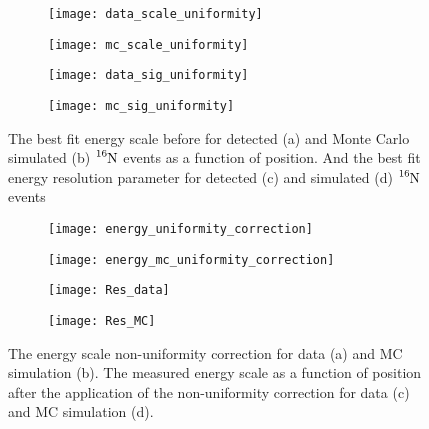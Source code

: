 \begin{figure}[htbp]
\centering
\begin{subfigure}{0.49\textwidth}
\centering
\texttt{[image: data\_scale\_uniformity]}
\caption[]{}
\end{subfigure}
\hfill
\begin{subfigure}{0.49\textwidth}
\centering
\texttt{[image: mc\_scale\_uniformity]}
\caption[]{}
\end{subfigure}

\begin{subfigure}{0.49\textwidth}
\centering
\texttt{[image: data\_sig\_uniformity]}
\caption[]{}
\end{subfigure}
\hfill
\begin{subfigure}{0.49\textwidth}
\centering
\texttt{[image: mc\_sig\_uniformity]}
\caption[]{}
\end{subfigure}
\caption[Position Depedence of Energy Scale and Resolution from $\ce{^{16}N}$]
{The best fit energy scale before for detected (a) and Monte Carlo simulated (b)  $\ce{^{16}N}$
events as a function of position.
And the best fit energy resolution parameter for detected (c) and 
simulated (d) $\ce{^{16}N}$ events}
\label{fig:n16_uniformity}
\end{figure}

\begin{figure}[htbp]
\begin{subfigure}{0.49\textwidth}
\centering
\texttt{[image: energy\_uniformity\_correction]}
\caption[]{}
\end{subfigure}
\hfill
\begin{subfigure}{0.49\textwidth}
\centering
\texttt{[image: energy\_mc\_uniformity\_correction]}
\caption[]{}
\end{subfigure}

\begin{subfigure}{0.49\textwidth}
\centering
\texttt{[image: Res\_data]}
\caption[]{}
\end{subfigure}
\hfill
\begin{subfigure}{0.49\textwidth}
\centering
\texttt{[image: Res\_MC]}
\caption[]{}
\end{subfigure}
\caption[Energy Scale Uniformity Correction and Results]{The energy scale
non-uniformity correction for data (a) and MC simulation (b).
The measured energy scale as a function of position after the application
of the non-uniformity correction for data (c) and MC simulation (d).}
\label{fig:uniformity_corrections}
\end{figure}

